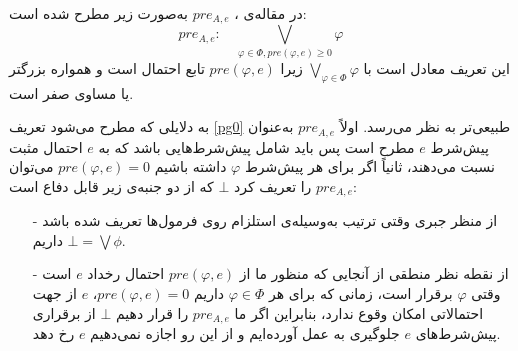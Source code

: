 \begin{remark}\label{preAe}
در مقاله‌ی \citep{Benthem2009}، $ pre_{A,e} $ به‌صورت زیر مطرح شده است:
\begin{equation}\label{pgeq0}
pre_{A,e} :\quad\bigvee_{\varphi\in\Phi,pre(\varphi,e)\geq 0}\varphi
\end{equation}
این تعریف معادل است با $ \bigvee_{\varphi\in\Phi}\varphi $ زیرا $ pre(\varphi,e) $ تابع احتمال است و همواره بزرگتر یا مساوی صفر است.

به دلایلی که مطرح می‌شود تعریف \ref{pg0} طبیعی‌تر به نظر می‌رسد. اولاً $ pre_{A,e} $ به‌عنوان پیش‌شرط $ e  $ مطرح است پس باید شامل پیش‌شرط‌هایی باشد که به $ e $ احتمال مثبت نسبت می‌دهند، ثانیاً اگر برای هر پیش‌شرط $ \varphi $ داشته باشیم $ pre(\varphi,e)=0 $ می‌توان $ pre_{A,e} $ را تعریف کرد $ \bot $ که از دو جنبه‌ی زیر قابل دفاع است:
\begin{itemize}
\item[-]
از منظر جبری وقتی ترتیب به‌وسیله‌ی استلزام روی فرمول‌ها تعریف شده باشد داریم $ \bot=\bigvee \phi $.
\item[-]
از نقطه نظر منطقی از آنجایی که منظور ما از $ pre(\varphi,e) $ احتمال رخداد $ e $ است وقتی $ \varphi $ برقرار است، زمانی که برای هر $ \varphi\in\Phi $ داریم $ pre(\varphi,e)=0 $، $ e $ از جهت احتمالاتی امکان وقوع ندارد، بنابراین اگر ما $ pre_{A,e} $ را قرار دهیم $ \bot $ از برقراری پیش‌شرط‌های $ e $ جلوگیری به عمل آورده‌ایم و از این رو اجازه نمی‌دهیم $ e $ رخ دهد.
\end{itemize}
\end{remark}
